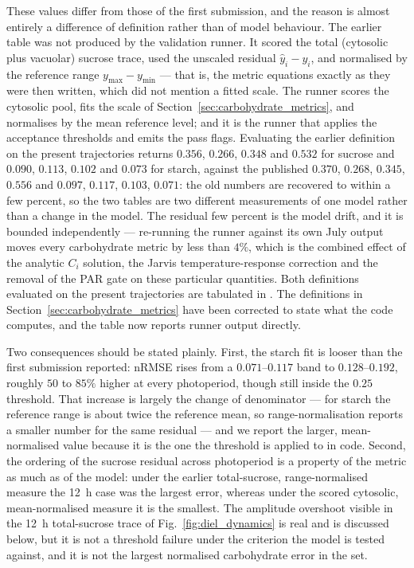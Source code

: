 \documentclass[a4paper,fleqn]{cas-sc}
\begin{document}
These values differ from those of the first submission, and the reason is
almost entirely a difference of definition rather than of model behaviour. The
earlier table was not produced by the validation runner. It scored the total
(cytosolic plus vacuolar) sucrose trace, used the unscaled residual $\hat{y}_i
- y_i$, and normalised by the reference range $y_{\max} - y_{\min}$ --- that
is, the metric equations exactly as they were then written, which did not
mention a fitted scale. The runner scores the cytosolic pool, fits the scale
of Section~\ref{sec:carbohydrate_metrics}, and normalises by the mean
reference level; and it is the runner that applies the acceptance thresholds
and emits the pass flags. Evaluating the earlier definition on the present
trajectories returns $0.356$, $0.266$, $0.348$ and $0.532$ for sucrose and
$0.090$, $0.113$, $0.102$ and $0.073$ for starch, against the published
$0.370$, $0.268$, $0.345$, $0.556$ and $0.097$, $0.117$, $0.103$, $0.071$: the
old numbers are recovered to within a few percent, so the two tables are two
different measurements of one model rather than a change in the model. The
residual few percent is the model drift, and it is bounded independently ---
re-running the runner against its own July output moves every carbohydrate
metric by less than $4\%$, which is the combined effect of the analytic $C_i$
solution, the Jarvis temperature-response correction and the removal of the
PAR gate on these particular quantities. Both definitions evaluated on the
present trajectories are tabulated in
\protect{}. The
definitions in Section~\ref{sec:carbohydrate_metrics} have been corrected to
state what the code computes, and the table now reports runner output
directly.

Two consequences should be stated plainly. First, the starch fit is looser
than the first submission reported: nRMSE rises from a $0.071$--$0.117$ band
to $0.128$--$0.192$, roughly $50$ to $85\%$ higher at every photoperiod,
though still inside the $0.25$ threshold. That increase is largely the change
of denominator --- for starch the reference range is about twice the reference
mean, so range-normalisation reports a smaller number for the same residual
--- and we report the larger, mean-normalised value because it is the one the
threshold is applied to in code. Second, the ordering of the sucrose residual
across photoperiod is a property of the metric as much as of the model: under
the earlier total-sucrose, range-normalised measure the 12~h case was the
largest error, whereas under the scored cytosolic, mean-normalised measure it
is the smallest. The amplitude overshoot visible in the 12~h total-sucrose
trace of Fig.~\ref{fig:diel_dynamics} is real and is discussed below, but it
is not a threshold failure under the criterion the model is tested against,
and it is not the largest normalised carbohydrate error in the set.
\end{document}
